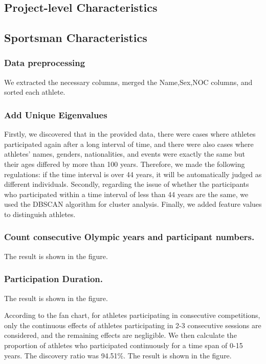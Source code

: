 \documentclass{mcmthesis}
\begin{document}
  \subsection{Project-level Characteristics}
  \subsection{Sportsman Characteristics}
  \subsubsection{Data preprocessing}
  We extracted the necessary columns, merged the Name,Sex,NOC columns, and sorted each athlete.
  \subsubsection{Add Unique Eigenvalues}
  Firstly, we discovered that in the provided data, there were cases where athletes participated again after a long interval of time, and there were also cases where athletes' names, genders, nationalities, and events were exactly the same but their ages differed by more than 100 years. Therefore, we made the following regulations: if the time interval is over 44 years, it will be automatically judged as different individuals. Secondly, regarding the issue of whether the participants who participated within a time interval of less than 44 years are the same, we used the DBSCAN algorithm for cluster analysis. Finally, we added feature values to distinguish athletes.
  \subsubsection{Count consecutive Olympic years and participant numbers.}
  The result is shown in the figure.

  
  


 
  
  \subsubsection{Participation Duration.}
  The result is shown in the figure.
 
  According to the fan chart, for athletes participating in consecutive competitions, only the continuous effects of athletes participating in 2-3 consecutive sessions are considered, and the remaining effects are negligible.
  We then calculate the proportion of athletes who participated continuously for a time span of 0-15 years. The discovery ratio was 94.51\%.
  The result is shown in the figure.
\end{document}
